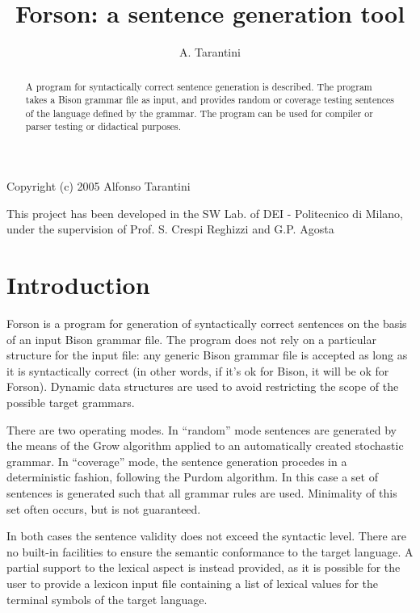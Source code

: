 \documentclass[a4paper,12pt]{article}
\title{Forson: a sentence generation tool}
\author{A. Tarantini}
\begin{document}
\maketitle
\begin{center}
Copyright (c)  2005  Alfonso Tarantini

This project has been developed in the SW Lab. of  DEI - Politecnico di Milano,
under the supervision of Prof. S. Crespi Reghizzi and G.P. Agosta
\end{center}

\bigskip

\begin{abstract}
A program for syntactically correct sentence generation is described. The program takes a Bison grammar file as input, and provides random or coverage testing sentences of the language defined by the grammar. The program can be used for compiler or parser testing or didactical purposes.
\end{abstract}

\bigskip

\section{Introduction}
Forson is a program for generation of syntactically correct sentences on the basis of an input Bison grammar file.
The program does not rely on a particular structure for the input file: any generic Bison grammar file is accepted as long as it is syntactically correct (in other words, if it's ok for Bison, it will be ok for Forson). Dynamic data structures are used to avoid restricting the scope of the possible target grammars.

There are two operating modes. In ``random'' mode sentences are generated by the means of the Grow algorithm applied to an automatically created stochastic grammar. In ``coverage'' mode, the sentence generation procedes in a deterministic fashion, following the Purdom algorithm. In this case a set of sentences is generated such that all grammar rules are used. Minimality of this set often occurs, but is not guaranteed.

In both cases the sentence validity does not exceed the syntactic level. There are no built-in facilities to ensure the semantic conformance to the target language. A partial support to the lexical aspect is instead provided, as it is possible for the user to provide a lexicon input file containing a list of lexical values for the terminal symbols of the target language.
\end{document}
